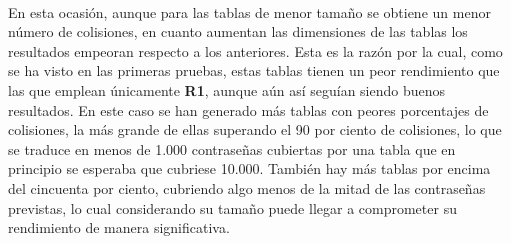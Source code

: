 \documentclass[12pt,spanish,listoffigures,listoftables]{tfgetsinf}
\begin{document}
\def\arraystretch{1.5}
\begin{table}[H]
	\centering
	\caption{Porcentajes de colisiones para las tablas empleando \textbf{R2}}
	\label{colR2}
\end{table}
~\\

En esta ocasión, aunque para las tablas de menor tamaño se obtiene un menor número de colisiones, en cuanto aumentan las dimensiones de las tablas los resultados empeoran respecto a los anteriores. Esta es la razón por la cual, como se ha visto en las primeras pruebas, estas tablas tienen un peor rendimiento que las que emplean únicamente \textbf{R1}, aunque aún así seguían siendo buenos resultados. En este caso se han generado más tablas con peores porcentajes de colisiones, la más grande de ellas superando el 90 por ciento de colisiones, lo que se traduce en menos de 1.000 contraseñas cubiertas por una tabla que en principio se esperaba que cubriese 10.000. También hay más tablas por encima del cincuenta por ciento, cubriendo algo menos de la mitad de las contraseñas previstas, lo cual considerando su tamaño puede llegar a comprometer su rendimiento de manera significativa.
\end{document}

